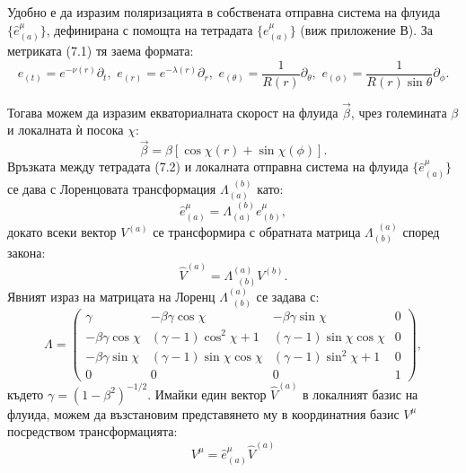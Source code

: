Удобно е да изразим поляризацията в собствената отправна система на флуида $\{\hat{e}^\mu_{(a)}\}$, дефинирана с помощта на тетрадата $\{e^\mu_{(a)}\}$ (виж приложение В). За метриката (7.1) тя заема формата:
\begin{equation}
	e_{(t)} = e^{-\nu(r)}\partial_t,\,\, e_{(r)} = e^{-\lambda(r)}\partial_r,\,\, e_{(\theta)} = \frac{1}{R(r)}\partial_{\theta},\,\, e_{(\phi)} = \frac{1}{R(r)\sin\theta}\partial_{\phi}.
\end{equation}

Тогава можем да изразим екваториалната скорост на флуида $\vec{\beta}$, чрез големината $\beta$ и локалната ѝ посока $\chi$:
\begin{equation}
	\vec{\beta} = \beta\left[\cos\chi (r) + \sin\chi (\phi)\right].
\end{equation}
Връзката между тетрадата (7.2) и локалната отправна система на флуида $\{\hat{e}^\mu_{(a)}\}$ се дава с Лоренцовата трансформация $\Lambda^{\,\,\,(b)}_{(a)}$ като:
\begin{equation}
	\hat{e}^\mu_{(a)} = \Lambda^{\,\,\,(b)}_{(a)}e^\mu_{(b)},
\end{equation}
докато всеки вектор $V^{(a)}$ се трансформира с обратната матрица $\Lambda^{\,\,\,(a)}_{(b)}$ според закона:
\begin{equation}
	\hat{V}^{(a)} = \Lambda^{(a)}_{\,\,\,(b)} V^{(b)}.
\end{equation}
Явният израз на матрицата на Лоренц $\Lambda^{(a)}_{\,\,\,(b)}$ се задава с:
\begin{equation}
	\Lambda = \begin{pmatrix}
			\gamma 			 & -\beta\gamma\cos\chi 	    & -\beta\gamma\sin\chi 		   & 0 \\
		-\beta\gamma\cos\chi & (\gamma - 1)\cos^2\chi + 1   & (\gamma - 1)\sin\chi\cos\chi & 0 \\
		-\beta\gamma\sin\chi & (\gamma - 1)\sin\chi\cos\chi & (\gamma - 1)\sin^2\chi + 1   & 0 \\
				0			 &					0			&				0			   & 1
	\end{pmatrix},
\end{equation}
където $\gamma = (1 - \beta^2)^{-1/2}$. Имайки един вектор $\hat{V}^{(a)}$ в локалният базис на флуида, можем да възстановим представянето му в координатния базис $V^\mu$ посредством трансформацията:
\begin{equation}
	V^\mu = \hat{e}^\mu_{(a)}\hat{V}^{(a)}
\end{equation}

